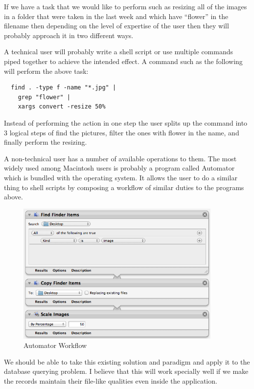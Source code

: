 If we have a task that we would like to perform such as resizing all of the images in a folder that were taken in the last week and which have ``flower'' in the filename then depending on the level of expertise of the user then they will probably approach it in two different ways.

A technical user will probably write a shell script or use multiple commands piped together to achieve the intended effect. A command such as the following will perform the above task:

\begin{verbatim}
  find . -type f -name "*.jpg" |
    grep "flower" |
    xargs convert -resize 50%
\end{verbatim}

Instead of performing the action in one step the user splits up the command into 3 logical steps of find the pictures, filter the ones with flower in the name, and finally perform the resizing.

A non-technical user has a number of available operations to them. The most widely used among Macintosh users is probably a program called Automator which is bundled with the operating system. It allows the user to do a similar thing to shell scripts by composing a workflow of similar duties to the programs above.

\begin{figure}[ht!]
	\centering
	\includegraphics[width=0.9\textwidth]{images/automator}
	\caption{Automator Workflow}
	\label{fig:automator}
\end{figure}

We should be able to take this existing solution and paradigm and apply it to the database querying problem. I believe that this will work specially well if we make the records maintain their file-like qualities even inside the application.

